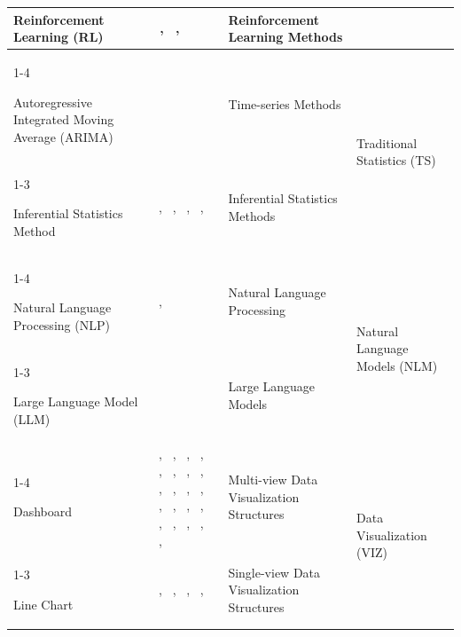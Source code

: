 \documentclass{sfuthesis}
\begin{document}
\begin{appendices}
\begin{landscape}
\begin{longtable}{
p{5.5cm}
p{4cm}
p{6cm}
p{3.5cm}
}
Reinforcement Learning (RL) &
~\cite{krishnan2024data}, ~\cite{miao2025research}, ~\cite{wang2026intelligent} &
Reinforcement Learning Methods &
\\
\cline{1-4}


Autoregressive Integrated Moving Average (ARIMA) &
~\cite{krishnan2024data} &
Time-series Methods &
\multirow{2}{3.5cm}{Traditional Statistics (TS)}
\\
\cline{1-3}

Inferential Statistics Method &
~\cite{cavieres_methodology_2020}, ~\cite{Monti2025RailwayBridgeDSS}, ~\cite{muller2021risk}, ~\cite{sreepathy2023design}, ~\cite{ataei2024intelligent} &
Inferential Statistics Methods &
\\
\cline{1-4}

Natural Language Processing (NLP) &
~\cite{Shapa2021PoultryFarmers}, ~\cite{miao2025construction} &
Natural Language Processing &
\multirow{2}{3.5cm}{Natural Language Models (NLM)}
\\
\cline{1-3}

Large Language Model (LLM) &
~\cite{zhou2026safedrive} &
Large Language Models &
\\
\cline{1-4}

Dashboard &
~\cite{Yang2010MacroeconomicDSS}, ~\cite{Han2020WastewaterDecisionMaking}, ~\cite{krishnan2024data}, ~\cite{DelaCal2026CulturalTourism}, ~\cite{Pahuja2024Dexter}, ~\cite{Dahl2022PathologyLaboratories}, ~\cite{Sheikhkhoshkar2025ConstructionDSS}, ~\cite{Osman2021SmartCities}, ~\cite{song2024building}, ~\cite{gaftandzhieva2023data}, ~\cite{kim2025development}, ~\cite{o20184d}, ~\cite{street2022data}, ~\cite{chorev2017data}, ~\cite{vandewiele2018decision}, ~\cite{sreepathy2023design}, ~\cite{peters2023data}, ~\cite{weiner_integrating_2015}, ~\cite{price2025aura}, ~\cite{lusher2014data}, ~\cite{hansotte2021supporting}, ~\cite{catalano2017using} &
Multi-view Data Visualization Structures &
\multirow{10}{3.5cm}{Data Visualization (VIZ)}
\\
\cline{1-3}

Line Chart &
~\cite{Yang2010MacroeconomicDSS}, ~\cite{Sonehara2019CyberPhysicalSociety}, ~\cite{Milic2024DataCenterEnergy}, ~\cite{RiosZertuche2020ElectronicDecisionSupport}, ~\cite{doderer2010sidekick} &
\multirow{6}{6cm}{Single-view Data Visualization Structures}
&
\\


\end{longtable}
\end{landscape}
\end{appendices}
\end{document}
